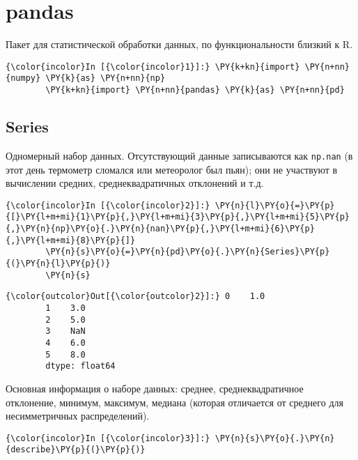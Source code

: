 \section{pandas}
\label{pandas}

Пакет для статистической обработки данных, по функциональности близкий к
R.

    \begin{Verbatim}[commandchars=\\\{\}]
{\color{incolor}In [{\color{incolor}1}]:} \PY{k+kn}{import} \PY{n+nn}{numpy} \PY{k}{as} \PY{n+nn}{np}
        \PY{k+kn}{import} \PY{n+nn}{pandas} \PY{k}{as} \PY{n+nn}{pd}
\end{Verbatim}

\subsection{Series}
\label{pandas1}

Одномерный набор данных. Отсутствующий данные записываются как
\texttt{np.nan} (в этот день термометр сломался или метеоролог был
пьян); они не участвуют в вычислении средних, среднеквадратичных
отклонений и т.д.

    \begin{Verbatim}[commandchars=\\\{\}]
{\color{incolor}In [{\color{incolor}2}]:} \PY{n}{l}\PY{o}{=}\PY{p}{[}\PY{l+m+mi}{1}\PY{p}{,}\PY{l+m+mi}{3}\PY{p}{,}\PY{l+m+mi}{5}\PY{p}{,}\PY{n}{np}\PY{o}{.}\PY{n}{nan}\PY{p}{,}\PY{l+m+mi}{6}\PY{p}{,}\PY{l+m+mi}{8}\PY{p}{]}
        \PY{n}{s}\PY{o}{=}\PY{n}{pd}\PY{o}{.}\PY{n}{Series}\PY{p}{(}\PY{n}{l}\PY{p}{)}
        \PY{n}{s}
\end{Verbatim}

            \begin{Verbatim}[commandchars=\\\{\}]
{\color{outcolor}Out[{\color{outcolor}2}]:} 0    1.0
        1    3.0
        2    5.0
        3    NaN
        4    6.0
        5    8.0
        dtype: float64
\end{Verbatim}
        
    Основная информация о наборе данных: среднее, среднеквадратичное
отклонение, минимум, максимум, медиана (которая отличается от среднего
для несимметричных распределений).

    \begin{Verbatim}[commandchars=\\\{\}]
{\color{incolor}In [{\color{incolor}3}]:} \PY{n}{s}\PY{o}{.}\PY{n}{describe}\PY{p}{(}\PY{p}{)}
\end{Verbatim}

